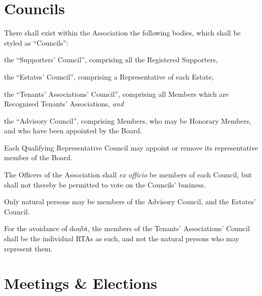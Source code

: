 \documentclass[12pt]{article}
\newcommand{\EC}[0]{Board}
\newcommand{\RTA}[0]{Recognised Tenants' Association}
\newcommand{\avoiddoubt}[0]{For the avoidance of doubt}
\newcommand{\ITand}[0]{\textit{and}}
\begin{document}

\section{Councils}
\label{councils}
\begin{constenum}

\item There shall exist within the Association the following bodies, which
  shall be styled as ``Councils'':
  \begin{constenum}
  \item the ``Supporters' Council'', comprising all the Registered
    Supporters,
  \item the ``Estates' Council'', comprising a Representative of each Estate,
  \item the ``Tenants' Associations' Council'', comprising all Members
    which are \RTA{}s, \ITand
  \item the ``Advisory Council'', comprising Members, who may be
    Honorary Members, and who have been appointed by the
    \EC{}.\label{advcouncil}
  \end{constenum}

\item Each Qualifying Representative Council may
  appoint or remove its representative member of the \EC{}.
  \label{councilreps}

\item The Officers of the Association shall \textit{ex officio} be members
  of each Council, but shall not thereby be permitted to vote on the
  Councils' business.

\item Only natural persons may be members of the Advisory Council, and
  the Estates' Council.

\item \avoiddoubt, the members of the Tenants' Associations' Council
  shall be the individual RTAs as such, and not the natural persons
  who may represent them.

\end{constenum}


\section{Meetings \& Elections}
\end{document}
